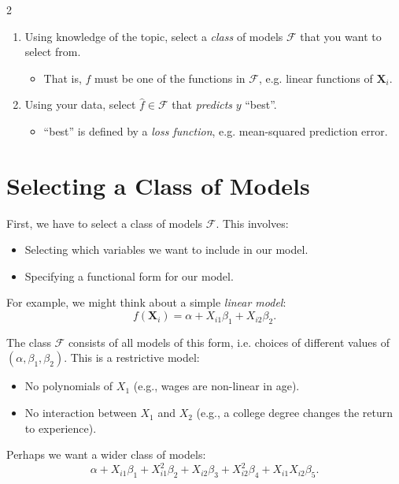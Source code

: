 \documentclass[12pt]{article}
\begin{document}
\begin{multicols}{2}
\begin{enumerate}
      \smallskip
    \item Using knowledge of the topic, select a \emph{class} of models $\mathcal{F}$ that you want to select from.
      \begin{itemize}
        \item That is, $\hat{f}$ must be one of the functions in $\mathcal{F}$, e.g. linear functions of $\bm{X}_i$.
      \end{itemize}

      \smallskip
    \item Using your data, select $\hat{f} \in \mathcal{F}$ that \emph{predicts} $y$ ``best''.
      \begin{itemize}
        \item ``best'' is defined by a \emph{loss function}, e.g. mean-squared prediction error.
      \end{itemize}
  \end{enumerate}

  \section*{Selecting a Class of Models}

  First, we have to select a class of models $\mathcal{F}$. This involves:
  \begin{itemize}
    \item Selecting which variables we want to include in our model.
    \item Specifying a functional form for our model.
  \end{itemize}

  For example, we might think about a simple \emph{linear model}:
  $$f(\bm{X}_i) = \alpha + X_{i1} \beta_1 + X_{i2} \beta_2.$$

  The class $\mathcal{F}$ consists of all models of this form, i.e. choices of different values of $(\alpha, \beta_1, \beta_2)$.
  This is a restrictive model:
  \begin{itemize}
    \item No polynomials of $X_1$ (e.g., wages are non-linear in age).
    \item No interaction between $X_1$ and $X_2$ (e.g., a college degree changes the return to experience).
  \end{itemize}

  Perhaps we want a wider class of models:
  $$\alpha + X_{i1} \beta_1 + X_{i1}^2 \beta_2 + X_{i2} \beta_3 + X_{i2}^2 \beta_4 + X_{i1} X_{i2} \beta_5.$$


\end{multicols}
\end{document}
